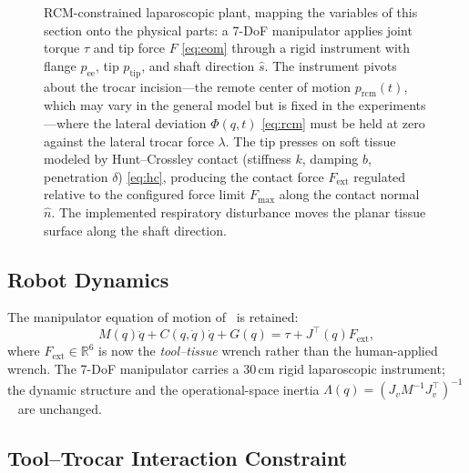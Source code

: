 \begin{figure}[t]
{}
\caption{RCM-constrained laparoscopic plant, mapping the variables of this
section onto the physical parts: a 7-DoF manipulator applies joint torque
$\tau$ and tip force $F$ \eqref{eq:eom} through a rigid instrument with flange
$p_\text{ee}$, tip $p_\text{tip}$, and shaft direction $\hat s$. The instrument
pivots about the trocar incision---the remote center of motion $p_\text{rcm}(t)$,
which may vary in the general model but is fixed in the experiments---where the lateral deviation
$\Phi(q,t)$ \eqref{eq:rcm} must be held at zero against the lateral trocar force
$\lambda$. The tip presses on soft tissue modeled by Hunt--Crossley contact
(stiffness $k$, damping $b$, penetration $\delta$) \eqref{eq:hc}, producing the
contact force $F_\text{ext}$ regulated relative to the configured force limit
$F_\text{max}$ along the contact normal $\hat n$. The implemented respiratory
disturbance moves the planar tissue surface along the shaft direction.}
\label{fig:plant}
\end{figure}

\subsection{Robot Dynamics}

The manipulator equation of motion of~\cite{cao2026phri} is retained:
\begin{equation}
M(q)\ddot{q} + C(q,\dot{q})\dot{q} + G(q) = \tau + J^\top(q) F_{\text{ext}},
\label{eq:eom}
\end{equation}
where $F_{\text{ext}} \in \mathbb{R}^6$ is now the \emph{tool--tissue} wrench rather than the human-applied wrench. The 7-DoF manipulator carries a 30\,cm rigid laparoscopic instrument; the dynamic structure and the operational-space inertia $\Lambda(q) = (J_v M^{-1} J_v^\top)^{-1}$~\cite{khatib1987} are unchanged.

\subsection{Tool--Trocar Interaction Constraint}

